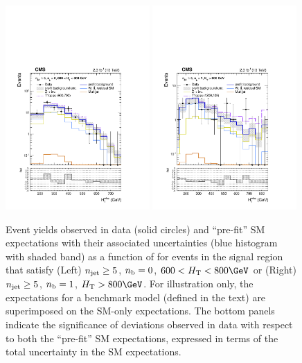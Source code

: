 \begin{figure}[tbhp]
  \begin{center}
    \includegraphics[width=0.49\textwidth]{figures/mht_shapes/v1/postFitShape_eq0b_ge5j_600_800_prefit_T1qqqq_900_700} 
    \includegraphics[width=0.49\textwidth]{figures/mht_shapes/v1/postFitShape_eq1b_ge5j_800_Inf_prefit_T1qqqq_1200_100} \\
  \end{center}
  \caption{Event yields observed in data (solid circles) and
    ``pre-fit'' SM expectations with their associated uncertainties
    (blue histogram with shaded band) as a function of \HTmiss for
    events in the signal region that satisfy (Left) $n_{\text{jet}} \geq 5$,
    $n_{\text{b}} = 0$, $600 < \scalht < 800\GeV$ or (Right) $n_{\text{jet}} \geq 5$,
    $n_{\text{b}} = 1$, $\scalht > 800\GeV$. For illustration only, the
    expectations for a benchmark model (defined in the text) are
    superimposed on the SM-only expectations. The bottom panels
    indicate the significance of deviations observed in data with
    respect to both the ``pre-fit'' SM expectations, expressed in
    terms of the total uncertainty in the SM expectations. }
    \label{fig:mht-templates} 
\end{figure}
